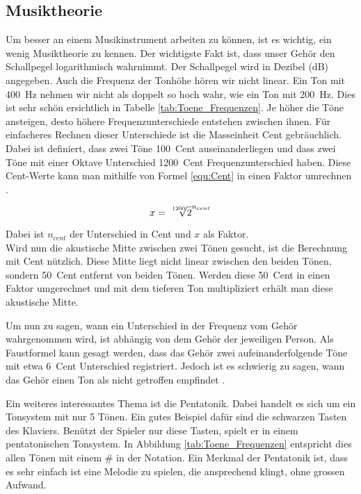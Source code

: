 \subsection{Musiktheorie}\label{subsec:Musiktheorie}

Um besser an einem Musikinstrument arbeiten zu können, ist es wichtig, ein wenig Musiktheorie zu kennen. Der wichtigste Fakt ist, dass unser Gehör den Schallpegel logarithmisch wahrnimmt. Der Schallpegel wird in Dezibel (dB) angegeben. Auch die Frequenz der Tonhöhe hören wir nicht linear. Ein Ton mit \SI{400}{Hz} nehmen wir nicht als doppelt so hoch wahr, wie ein Ton mit \SI{200}{Hz}. Dies ist sehr schön ersichtlich in Tabelle \ref{tab:Toene_Frequenzen}. Je höher die Töne ansteigen, desto höhere Frequenzunterschiede entstehen zwischen ihnen. Für einfacheres Rechnen dieser Unterschiede ist die Masseinheit Cent gebräuchlich. Dabei ist definiert, dass zwei Töne \SI{100}{Cent} auseinanderliegen und dass zwei Töne mit einer Oktave Unterschied \SI{1200}{Cent} Frequenzunterschied haben. Diese Cent-Werte kann man mithilfe von Formel \ref{equ:Cent} in einen Faktor umrechnen \cite{Cent}.

\begin{equation}
x = \sqrt[\leftroot{-2}\uproot{1}1200]{2}^{n_{cent}}
\label{equ:Cent}
\end{equation} 

Dabei ist \(n_{cent}\) der Unterschied in Cent und \(x\) als Faktor.\\
Wird nun die \glqq akustische\grqq{} Mitte zwischen zwei Tönen gesucht, ist die Berechnung mit Cent nützlich. Diese Mitte liegt nicht linear zwischen den beiden Tönen, sondern \SI{50}{Cent} entfernt von beiden Tönen. Werden diese \SI{50}{Cent} in einen Faktor umgerechnet und mit dem tieferen Ton multipliziert erhält man diese \glqq akustische\grqq{} Mitte.

Um nun zu sagen, wann ein Unterschied in der Frequenz vom Gehör wahrgenommen wird, ist abhängig von dem Gehör der jeweiligen Person. Als Faustformel kann gesagt werden, dass das Gehör zwei aufeinanderfolgende Töne mit etwa \SI{6}{Cent} Unterschied registriert. Jedoch ist es schwierig zu sagen, wann das Gehör einen Ton als \glqq nicht getroffen\grqq{} empfindet \cite{Cent}.

Ein weiteres interessantes Thema ist die Pentatonik. Dabei handelt es sich um ein Tonsystem mit nur 5 Tönen. Ein gutes Beispiel dafür sind die schwarzen Tasten des Klaviers. Benützt der Spieler nur diese Tasten, spielt er in einem pentatonischen Tonsystem. In Abbildung \ref{tab:Toene_Frequenzen} entspricht dies allen Tönen mit einem \# in der Notation. Ein Merkmal der Pentatonik ist, dass es sehr einfach ist eine Melodie zu spielen, die ansprechend klingt, ohne grossen Aufwand.\cite{Pentatonik}



